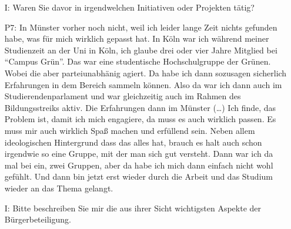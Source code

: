 \begin{itemize}
dar{\"u}ber informiert wie es weiter ging, weil wir halt auch die Dokumentation des Prozesses gr{\"o}{\ss}tenteils gemacht haben. Das hei{\ss}, wir haben dann auch immer die Protokolle der einzelnen Treffen verschriftlicht und hochgeladen, und so was. Auf unsere Internetseite. Wir haben da eine Internetplattform, schon ein Jahr vorher, gegr{\"u}ndet auf Initiative von [Dozent 1]. Bei dieser geht es darum, dass eine st{\"a}rkere Vernetzung zwischen Zivilgesellschaft und Wissenschaftlichkeit geschaffen werden soll. Wo wir halt schon einige Grundlagen dann auch gelegt haben. Da gibt es dann zum Beispiel Informationsmaterial, da gibt es das Transition Wiki in dem regionale Akteure schon aufgez{\"a}hlt sind, die durchaus eine Rolle spielen k{\"o}nnen. Also einzelne Gruppen, die kurz beschrieben. Aber auch Konzepte einf{\"u}hrend erl{\"a}utert. Wie "`Postwachstum"' oder "`Nachhaltigkeit - Was hei{\ss}t das eigentlich?"'.
    \item[I:] Waren Sie davor in irgendwelchen Initiativen oder Projekten t{\"a}tig?
    \item[P7:] In M{\"u}nster vorher noch nicht, weil ich leider lange Zeit nichts gefunden habe, was f{\"u}r mich wirklich gepasst hat. In K{\"o}ln war ich w{\"a}hrend meiner Studienzeit an der Uni in K{\"o}ln, ich glaube drei oder vier Jahre Mitglied bei "`Campus Gr{\"u}n"'. Das war eine studentische Hochschulgruppe der Gr{\"u}nen. Wobei die aber parteiunabh{\"a}nig agiert. Da habe ich dann sozusagen sicherlich Erfahrungen in dem Bereich sammeln k{\"o}nnen. Also da war ich dann auch im Studierendenparlament und war gleichzeitig auch im Rahmen des Bildungsstreiks aktiv. Die Erfahrungen dann im M{\"u}nster (\dots) Ich finde, das Problem ist, damit ich mich engagiere, da muss es auch wirklich passen. Es muss mir auch wirklich Spa{\ss} machen und erf{\"u}llend sein. Neben allem ideologischen Hintergrund dass das alles hat, brauch es halt auch schon irgendwie so eine Gruppe, mit der man sich gut versteht. Dann war ich da mal bei ein, zwei Gruppen, aber da habe ich mich dann einfach nicht wohl gef{\"u}hlt. Und dann bin jetzt erst wieder durch die Arbeit und das Studium wieder an das Thema gelangt.
    \item[I:] Bitte beschreiben Sie mir die aus ihrer Sicht wichtigsten Aspekte der B{\"u}rgerbeteiligung.

\end{itemize}
